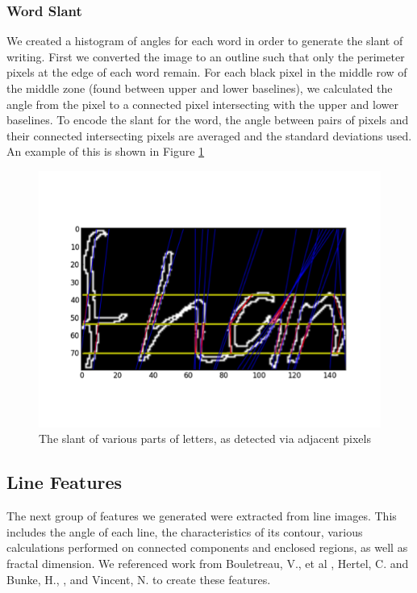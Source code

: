 \documentclass[paper=a4, fontsize=11pt]{scrartcl} %
\numberwithin{equation}{section} %
\numberwithin{figure}{section} %
\numberwithin{table}{section} %
\begin{document}
\subsubsection{Word Slant}
We created a histogram of angles for each word in order to generate
the slant of writing. First we converted the image to an outline such
that only the perimeter pixels at the edge of each word remain. For
each black pixel in the middle row of the middle zone (found between
upper and lower baselines), we calculated the angle from the pixel to
a connected pixel intersecting with the upper and lower baselines. To
encode the slant for the word, the angle between pairs of pixels and
their connected intersecting pixels are averaged and the standard
deviations used.  An example of this is shown in Figure
\ref{fig:wordslant}

\begin{figure}
  \centering \includegraphics{wordslant.png}
  \caption{The slant of various parts of letters, as detected via
    adjacent pixels}
  \label{fig:wordslant}
\end{figure}


\subsection{Line Features}
The next group of features we generated were extracted from line
images. This includes the angle of each line, the characteristics of
its contour, various calculations performed on connected components
and enclosed regions, as well as fractal dimension. We referenced work
from Bouletreau, V., et al \cite{SyntheticParameters}, Hertel, C. and
Bunke, H., \cite{NovelFeatures}, and Vincent,
N. \cite{FractalDimensions} to create these features.
\end{document}
